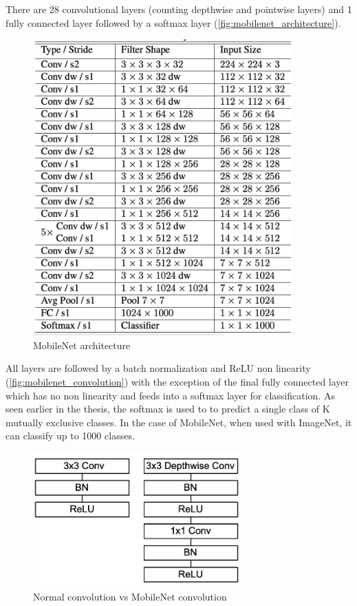 There are 28 convolutional layers (counting depthwise and pointwise layers) and
1 fully connected layer followed by a softmax layer
(\autoref{fig:mobilenet_architecture}).

\begin{figure}[ht]
    \includegraphics[width=10cm]{images/experiments/mobilenet_architecture.png}
    \centering
    \caption{MobileNet architecture}\label{fig:mobilenet_architecture}
\end{figure}

All layers are followed by a batch normalization and ReLU non linearity
(\autoref{fig:mobilenet_convolution}) with the exception of the final fully
connected layer which has no non linearity and feeds into a softmax layer for
classification.
As seen earlier in the thesis, the softmax is used to to predict a single class
of K mutually exclusive classes. In the case of MobileNet, when used with
ImageNet, it can classify up to 1000 classes.

\begin{figure}[ht]
    \includegraphics[width=8cm]{images/experiments/mobilenet_convolution.png}
    \centering
    \caption{Normal convolution vs MobileNet convolution}\label{fig:mobilenet_convolution}
\end{figure}


